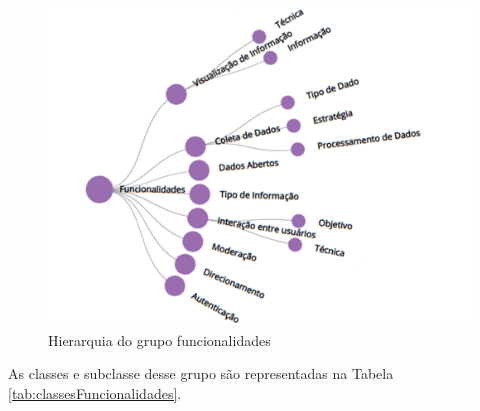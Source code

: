 \begin{figure}[!ht]
    \centering
    \includegraphics[scale=0.30]{./figuras/funcionalidades.png}
    \caption{Hierarquia do grupo funcionalidades}
    \label{fig:grupo-funcionalidades}
\end{figure}

\par
As classes e subclasse desse grupo são representadas  na Tabela \ref{tab:classesFuncionalidades}.

